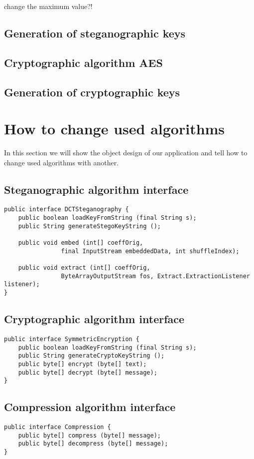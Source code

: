 \TODO change the maximum value?!

\subsection{Generation of steganographic keys}

\subsection{Cryptographic algorithm AES}

\subsection{Generation of cryptographic keys}

\section{How to change used algorithms}
In this section we will show the object design of our application
and tell how to change used algorithms with another.

\subsection{Steganographic algorithm interface}
\begin{lstlisting} 
public interface DCTSteganography {
    public boolean loadKeyFromString (final String s);
    public String generateStegoKeyString ();

    public void embed (int[] coeffOrig, 
                final InputStream embeddedData, int shuffleIndex);

    public void extract (int[] coeffOrig,  
                ByteArrayOutputStream fos, Extract.ExtractionListener listener);
}
\end{lstlisting}

\subsection{Cryptographic algorithm interface}
\begin{lstlisting} 
public interface SymmetricEncryption {
    public boolean loadKeyFromString (final String s);
    public String generateCryptoKeyString ();
    public byte[] encrypt (byte[] text);
    public byte[] decrypt (byte[] message);
}
\end{lstlisting}

\subsection{Compression algorithm interface}
\begin{lstlisting} 
public interface Compression {
    public byte[] compress (byte[] message);
    public byte[] decompress (byte[] message);
}
\end{lstlisting}

